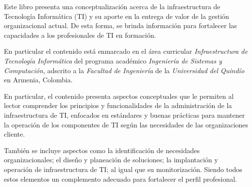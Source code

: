 





Este libro presenta una conceptualización acerca de la infraestructura de Tecnología Informática (TI) y su aporte
en la entrega de valor de la gestión organizacional actual. De esta forma, se brinda información para fortalecer las capacidades a los profesionales de TI en formación.

En particular el contenido está enmarcado en el área curricular \textit{Infraestructura de Tecnología Informática} del programa académico \textit{Ingeniería de Sistemas y Computación}, adscrito a la \textit{Facultad de Ingeniería} de la \textit{Universidad del Quindío} en Armenia, Colombia.

En particular, el contenido presenta aspectos conceptuales que le permiten al lector comprender los principios y funcionalidades de la administración de la infraestructura de TI, enfocados en estándares y buenas prácticas para mantener la operación de los componentes de TI según las necesidades de las organizaciones cliente.

También se incluye aspectos como la identificación de necesidades organizacionales; el diseño y planeación de soluciones; la implantación y operación de infraestructura de TI; al igual que su monitorización. Siendo todos estos elementos un complemento adecuado para fortalecer el perfil profesional.


